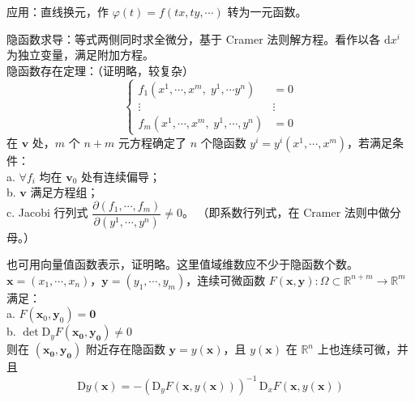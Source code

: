 \documentclass[12pt, a4paper, UTF8, openany]{ctexbook}
\newcommand{\dif}{\mathrm{d}}
\newcommand{\Dif}{\mathrm{D}}
\newcommand{\field}[1]{\mathbb{#1}}%
\newcommand{\mat}[1]{\mathbf{#1}}
\begin{document}

        {\heiti 应用}：直线换元，作 $\varphi(t) = f(tx, ty, \cdots)$ 转为一元函数。

        隐函数求导：等式两侧同时求全微分，基于 Cramer 法则解方程。看作以各 $\dif x^i$ 为独立变量，满足附加方程。\\
        隐函数存在定理：（证明略，较复杂）
        $$\begin{cases}
            f_1(x^1, \cdots, x^m, \; y^1, \cdots y^n) &= 0 \\
            \vdots & \vdots \\
            f_m(x^1, \cdots, x^m, \; y^1, \cdots, y^n) &= 0
        \end{cases}$$
        在 $\mat{v}$ 处，$m$ 个 $n + m$ 元方程确定了 $n$ 个隐函数 $y^i = y^i(x^1, \cdots, x^m)$，若满足条件：\\
        a. $\forall f_i$ 均在 $\mat{v}_0$ 处有连续偏导；\\
        b. $\mat{v}$ 满足方程组；\\
        c. Jacobi 行列式 $\dfrac{\partial (f_1, \cdots, f_m)}{\partial (y^1, \cdots, y^n)} \neq 0$。
        （即系数行列式，在 Cramer 法则中做分母。）

        也可用向量值函数表示，证明略。这里值域维数应不少于隐函数个数。\\
        $\mat{x} = (x_1, \cdots, x_n)$，$\mat{y} = (y_1, \cdots, y_m)$，连续可微函数 $F(\mat{x}, \mat{y}): \Omega \subset \field{R}^{n + m} \to \field{R}^{m}$ 满足：\\
        a. $F(\mat{x}_0, \mat{y}_0) = \mat{0}$ \\
        b. $\det \Dif_{y} F(\mat{x_0}, \mat{y_0}) \neq 0$ \\
        则在 $(\mat{x_0}, \mat{y_0})$ 附近存在隐函数 $\mat{y} = y(\mat{x})$，且 $y(\mat{x})$ 在 $\field{R}^{n}$ 上也连续可微，并且
        $$\Dif y(\mat{x}) = -(\Dif_y F(\mat{x}, y(\mat{x})))^{-1} \, \Dif_x F(\mat{x}, y(\mat{x}))$$
\end{document}
